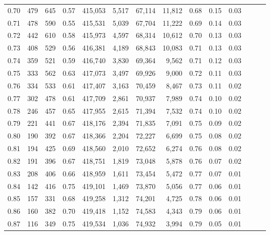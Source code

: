 \begin{tabular}{rrrrrrrrrrrrrr}
0.70 &     479 &    645 &  0.57 &  415,053 &    5,517 &  67,114 &  11,812 &  0.68 &  0.15 &      0.03 \\
0.71 &     478 &    590 &  0.55 &  415,531 &    5,039 &  67,704 &  11,222 &  0.69 &  0.14 &      0.03 \\
0.72 &     442 &    610 &  0.58 &  415,973 &    4,597 &  68,314 &  10,612 &  0.70 &  0.13 &      0.03 \\
0.73 &     408 &    529 &  0.56 &  416,381 &    4,189 &  68,843 &  10,083 &  0.71 &  0.13 &      0.03 \\
0.74 &     359 &    521 &  0.59 &  416,740 &    3,830 &  69,364 &   9,562 &  0.71 &  0.12 &      0.03 \\
0.75 &     333 &    562 &  0.63 &  417,073 &    3,497 &  69,926 &   9,000 &  0.72 &  0.11 &      0.03 \\
0.76 &     334 &    533 &  0.61 &  417,407 &    3,163 &  70,459 &   8,467 &  0.73 &  0.11 &      0.02 \\
0.77 &     302 &    478 &  0.61 &  417,709 &    2,861 &  70,937 &   7,989 &  0.74 &  0.10 &      0.02 \\
0.78 &     246 &    457 &  0.65 &  417,955 &    2,615 &  71,394 &   7,532 &  0.74 &  0.10 &      0.02 \\
0.79 &     221 &    441 &  0.67 &  418,176 &    2,394 &  71,835 &   7,091 &  0.75 &  0.09 &      0.02 \\
0.80 &     190 &    392 &  0.67 &  418,366 &    2,204 &  72,227 &   6,699 &  0.75 &  0.08 &      0.02 \\
0.81 &     194 &    425 &  0.69 &  418,560 &    2,010 &  72,652 &   6,274 &  0.76 &  0.08 &      0.02 \\
0.82 &     191 &    396 &  0.67 &  418,751 &    1,819 &  73,048 &   5,878 &  0.76 &  0.07 &      0.02 \\
0.83 &     208 &    406 &  0.66 &  418,959 &    1,611 &  73,454 &   5,472 &  0.77 &  0.07 &      0.01 \\
0.84 &     142 &    416 &  0.75 &  419,101 &    1,469 &  73,870 &   5,056 &  0.77 &  0.06 &      0.01 \\
0.85 &     157 &    331 &  0.68 &  419,258 &    1,312 &  74,201 &   4,725 &  0.78 &  0.06 &      0.01 \\
0.86 &     160 &    382 &  0.70 &  419,418 &    1,152 &  74,583 &   4,343 &  0.79 &  0.06 &      0.01 \\
0.87 &     116 &    349 &  0.75 &  419,534 &    1,036 &  74,932 &   3,994 &  0.79 &  0.05 &      0.01 \\

\end{tabular}

